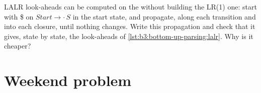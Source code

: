 \begin{exercise}[$\star\star\star$]\label{exo:b3:bottom-up-parsing:12}
LALR look-aheads can be computed on the  without building the LR(1) one: start with \$ on $\mathit{Start} \to \cdot\,S$ in the start state, and propagate, along each transition and into each closure, until nothing changes. Write this propagation and check that it gives, state by state, the look-aheads of \cref{lst:b3:bottom-up-parsing:lalr}. Why is it cheaper?
\end{exercise}

\section{Weekend problem}\label{sec:b3:bottom-up-parsing:problem}


